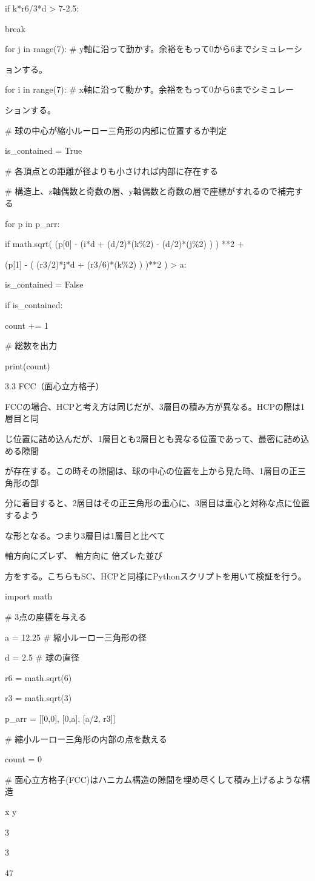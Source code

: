 if k*r6/3*d > 7-2.5:\par
break\par
for j in range(7): \# y軸に沿って動かす。余裕をもって0から6までシミュレーシ\par
ョンする。\par
for i in range(7): \# x軸に沿って動かす。余裕をもって0から6までシミュレー\par
ションする。\par
\# 球の中心が縮小ルーロー三角形の内部に位置するか判定\par
is\_contained = True\par
\# 各頂点との距離が径よりも小さければ内部に存在する\par
\# 構造上、z軸偶数と奇数の層、y軸偶数と奇数の層で座標がすれるので補完する\par
for p in p\_arr:\par
if math.sqrt( (p[0] - (i*d + (d/2)*(k\%2) - (d/2)*(j\%2) ) ) **2 +\par
(p[1] - ( (r3/2)*j*d + (r3/6)*(k\%2) ) )**2 ) > a:\par
is\_contained = False\par
if is\_contained:\par
count += 1\par
\# 総数を出力\par
print(count)\par
3.3 FCC（⾯⼼⽴⽅格⼦）\par
FCCの場合、HCPと考え⽅は同じだが、3層⽬の積み⽅が異なる。HCPの際は1層⽬と同\par
じ位置に詰め込んだが、1層⽬とも2層⽬とも異なる位置であって、最密に詰め込める隙間\par
が存在する。この時その隙間は、球の中⼼の位置を上から⾒た時、1層⽬の正三⾓形の部\par
分に着⽬すると、2層⽬はその正三⾓形の重⼼に、3層⽬は重⼼と対称な点に位置するよう\par
な形となる。つまり3層⽬は1層⽬と⽐べて\par
軸⽅向にズレず、 軸⽅向に 倍ズレた並び\par
⽅をする。こちらもSC、HCPと同様にPythonスクリプトを⽤いて検証を⾏う。\par
import math\par
\# 3点の座標を与える\par
a = 12.25 \# 縮小ルーロー三角形の径\par
d = 2.5   \# 球の直径\par
r6 = math.sqrt(6)\par
r3 = math.sqrt(3)\par
p\_arr = [[0,0], [0,a], [a/2, r3]]\par
\# 縮小ルーロー三角形の内部の点を数える\par
count = 0\par
\# 面心立方格子(FCC)はハニカム構造の隙間を埋め尽くして積み上げるような構造\par
x y\par
3\par
3\par
47\par

